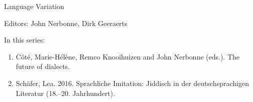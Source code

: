 {\large Language Variation}

\bigskip

Editors: John Nerbonne, Dirk Geeraerts

\bigskip

In this series:

\begin{enumerate}
\item Côté, Marie-Hélène, Remco Knooihuizen and John Nerbonne (eds.). The future of dialects.
\item Schäfer, Lea. 2016. Sprachliche Imitation: Jiddisch in der deutschsprachigen Literatur (18.–20. Jahrhundert).
\end{enumerate}



\vfill

